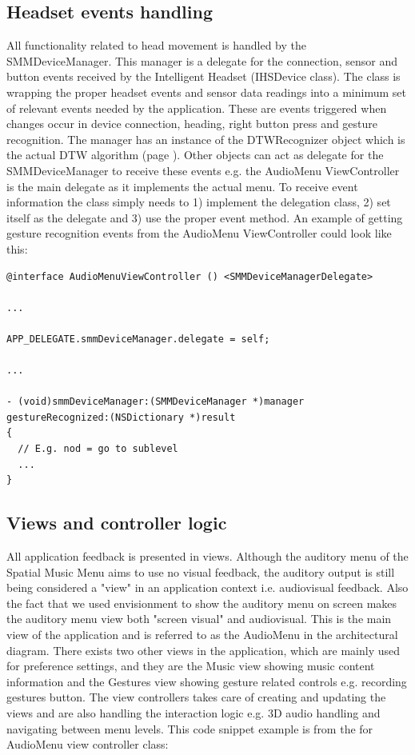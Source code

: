 \subsection{Headset events handling}
All functionality related to head movement is handled by the SMMDeviceManager. This manager is a delegate for the connection, sensor and button events received by the Intelligent Headset (IHSDevice class). The class is wrapping the proper headset events and sensor data readings into a minimum set of relevant events needed by the application. These are events triggered when changes occur in device connection, heading, right button press and gesture recognition. The manager has an instance of the DTWRecognizer object which is the actual DTW algorithm (page \pageref{sec:implementationgesturerecognition}). Other objects can act as delegate for the SMMDeviceManager to receive these events e.g. the AudioMenu ViewController is the main delegate as it implements the actual menu. To receive event information the class simply needs to 1) implement the delegation class, 2) set itself as the delegate and 3) use the proper event method. An example of getting gesture recognition events from the AudioMenu ViewController could look like this:

\begin{lstlisting}
@interface AudioMenuViewController () <SMMDeviceManagerDelegate>

...

APP_DELEGATE.smmDeviceManager.delegate = self;

...

- (void)smmDeviceManager:(SMMDeviceManager *)manager gestureRecognized:(NSDictionary *)result
{
  // E.g. nod = go to sublevel
  ...
}
\end{lstlisting}

\subsection{Views and controller logic}
\label{sec:implementationviewsandcontrollers}
All application feedback is presented in views. Although the auditory menu of the Spatial Music Menu aims to use no visual feedback, the auditory output is still being considered a "view" in an application context i.e. audiovisual feedback. Also the fact that we used envisionment to show the auditory menu on screen makes the auditory menu view both "screen visual" and audiovisual. This is the main view of the application and is referred to as the AudioMenu in the architectural diagram. There exists two other views in the application, which are mainly used for preference settings, and they are the Music view showing music content information and the Gestures view showing gesture related controls e.g. recording gestures button. The view controllers takes care of creating and updating the views and are also handling the interaction logic e.g. 3D audio handling and navigating between menu levels. This code snippet example is from the for AudioMenu view controller class:

